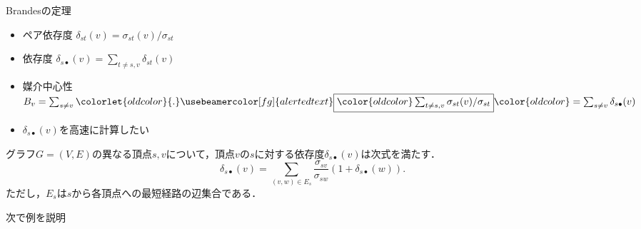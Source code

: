 \documentclass[dvipdfmx,fleqn]{beamer}
\begin{document}
\begin{frame}{Brandesの定理}
  \begin{itemize}\small
  \item ペア依存度 $\delta_{st}(v)=\sigma_{st}(v)/\sigma_{st}$
  \item 依存度
    $\delta_{s\bullet}(v)=\sum_{t\neq s,v}\delta_{st}(v)$
  \item 媒介中心性
    $B_v=\sum_{s\neq v}\colorlet{oldcolor}{.}\usebeamercolor[fg]{alerted text}\fbox{$\color{oldcolor}\sum_{t\neq s,v}\sigma_{st}(v)/\sigma_{st}$}\color{oldcolor}=\sum_{s\neq v}\delta_{s\bullet}(v)$
  \item $\delta_{s\bullet}(v)$を高速に計算したい
  \end{itemize}
  \medskip
  \begin{theorem}\rm
    \label{th:implicit-dependency}
    グラフ$G=(V,E)$の異なる頂点$s,v$について，頂点$v$の$s$に対する依存度$\delta_{s\bullet}(v)$は次式を満たす．
    \begin{equation*}
      \delta_{s\bullet}(v)=\sum_{(v,w)\in E_s}\frac{\sigma_{sv}}{\sigma_{sw}}(1+\delta_{s\bullet}(w)).
    \end{equation*}
    ただし，$E_s$は$s$から各頂点への最短経路の辺集合である．
  \end{theorem}
  \begin{flushright}
    \alert{次で例を説明}
  \end{flushright}
\end{frame}
\end{document}
